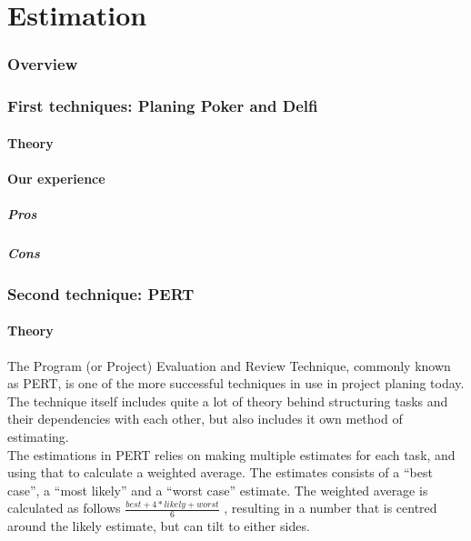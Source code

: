 \part{Estimation}
\section{Overview}
\section{First techniques: Planing Poker and Delfi}
\subsection{Theory}

\subsection{Our experience}

\subsubsection{Pros}

\subsubsection{Cons}

\section{Second technique: PERT}
\subsection{Theory}

The Program (or Project) Evaluation and Review Technique, commonly known as PERT, is one of the more successful techniques in use in project planing today. The technique itself includes quite a lot of theory behind structuring tasks and their dependencies with each other, but also includes it own method of estimating.\\

The estimations in PERT relies on making multiple estimates for each task, and using that to calculate a weighted average. The estimates consists of a ``best case'', a ``most likely'' and a ``worst case'' estimate. The weighted average is calculated as follows
$\frac{best+4*likely+worst}{6}$
, resulting in a number that is centred around the likely estimate, but can tilt to either sides.\
 
